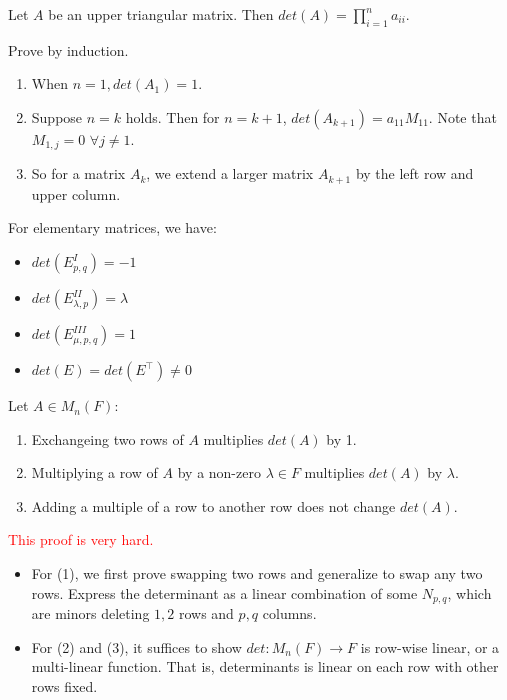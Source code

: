 \documentclass[12pt]{article}
\begin{document}
\begin{example}
    Let $A$ be an upper triangular matrix. Then $det(A)=\prod_{i=1}^{n}a_{ii}.$
\end{example}

\begin{pfbox}
    Prove by induction. 
    \begin{enumerate}
        \item When $n=1, det(A_1)=1$.
        \item Suppose $n=k$ holds. Then for $n=k+1$, $det(A_{k+1})=a_{11}M_{11}.$ 
        Note that $M_{1,j}=0\,\, \forall j\neq 1$. 
        \item So for a matrix $A_k$, we extend a larger matrix $A_{k+1}$ by the left row and upper column.
    \end{enumerate}
\end{pfbox}

\begin{theorem}
    For elementary matrices, we have:
    \begin{itemize}
        \item $det(E^I_{p,q})=-1$
        \item $det(E^{II}_{\lambda,p})=\lambda$
        \item $det(E^{III}_{\mu,p,q})=1$
        \item $det(E)=det(E^\top)\neq 0$
    \end{itemize}
\end{theorem}


\begin{theorem}
    Let $A\in M_n(F)$:
    \begin{enumerate}
        \item Exchangeing two rows of $A$ multiplies $det(A)$ by 1.
        \item Multiplying a row of $A$ by a non-zero $\lambda\in F$ multiplies $det(A)$ by $\lambda$.
        \item Adding a multiple of a row to another row does not change $det(A)$.
    \end{enumerate}
\end{theorem}

\begin{pfbox}
    \textcolor{red}{This proof is very hard.}
    \begin{itemize}
        \item For (1), we first prove swapping two rows and generalize to swap any two rows. Express the determinant as a linear combination of some $N_{p,q}$, which are minors deleting $1,2$ rows and $p,q$ columns.
        \item For (2) and (3), it suffices to show $det: M_n(F)\rightarrow F$ is row-wise linear, or a multi-linear function. That is, determinants is linear on each row with other rows fixed.
    \end{itemize}
\end{pfbox}
\end{document}
